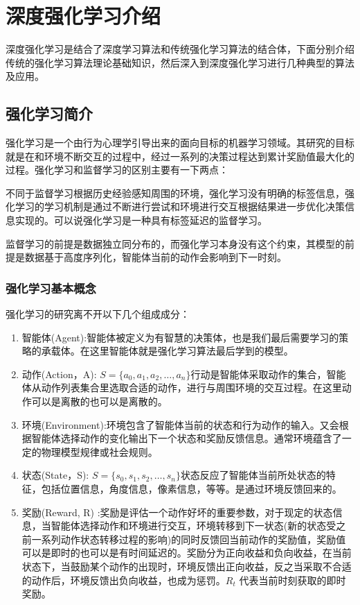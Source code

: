 \chapter{深度强化学习介绍}
深度强化学习是结合了深度学习算法和传统强化学习算法的结合体，下面分别介绍传统的强化学习算法理论基础知识，然后深入到深度强化学习进行几种典型的算法及应用。

\section{强化学习简介}
强化学习是一个由行为心理学引导出来的面向目标的机器学习领域。其研究的目标就是在和环境不断交互的过程中，经过一系列的决策过程达到累计奖励值最大化的过程。强化学习和监督学习的区别主要有一下两点：

不同于监督学习根据历史经验感知周围的环境，强化学习没有明确的标签信息，强化学习的学习机制是通过不断进行尝试和环境进行交互根据结果进一步优化决策信息实现的。可以说强化学习是一种具有标签延迟的监督学习。

监督学习的前提是数据独立同分布的，而强化学习本身没有这个约束，其模型的前提是数据基于高度序列化，智能体当前的动作会影响到下一时刻。

\subsection{强化学习基本概念}

强化学习的研究离不开以下几个组成成分：

\begin{enumerate}
	\item 智能体(Agent):智能体被定义为有智慧的决策体，也是我们最后需要学习的策略的承载体。在这里智能体就是强化学习算法最后学到的模型。
	\item 动作(Action，A): $ S=\{a_{0},a_{1},a_{2},\dots,a_{n}\} $行动是智能体采取动作的集合，智能体从动作列表集合里选取合适的动作，进行与周围环境的交互过程。在这里动作可以是离散的也可以是离散的。
	\item 环境(Environment):环境包含了智能体当前的状态和行为动作的输入。又会根据智能体选择动作的变化输出下一个状态和奖励反馈信息。通常环境蕴含了一定的物理模型规律或社会规则。
	\item 状态(State，S): $ S=\{s_{0},s_{1},s_{2},\dots,s_{n}\} $状态反应了智能体当前所处状态的特征，包括位置信息，角度信息，像素信息，等等。是通过环境反馈回来的。
	\item 奖励(Reward, R) :奖励是评估一个动作好坏的重要参数，对于现定的状态信息，当智能体选择动作和环境进行交互，环境转移到下一状态(新的状态受之前一系列动作状态转移过程的影响)的同时反馈回当前动作的奖励值，奖励值可以是即时的也可以是有时间延迟的。奖励分为正向收益和负向收益，在当前状态下，当鼓励某个动作的出现时，环境反馈出正向收益，反之当采取不合适的动作后，环境反馈出负向收益，也成为惩罚。${R_t}$ 代表当前时刻获取的即时奖励。
\end{enumerate}

